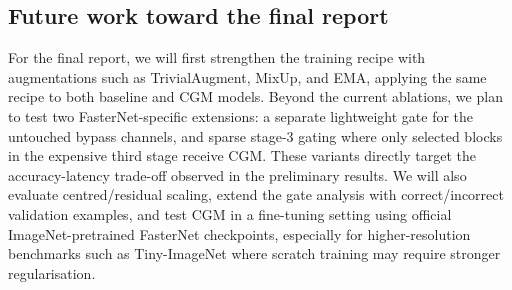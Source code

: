 \documentclass{article}
\begin{document}
\subsection{Future work toward the final report}\label{sec:future}

For the final report, we will first strengthen the training recipe with augmentations such as TrivialAugment, MixUp, and EMA, applying the same recipe to both baseline and CGM models. Beyond the current ablations, we plan to test two FasterNet-specific extensions: a separate lightweight gate for the untouched bypass channels, and sparse stage-3 gating where only selected blocks in the expensive third stage receive CGM. These variants directly target the accuracy-latency trade-off observed in the preliminary results. We will also evaluate centred/residual scaling, extend the gate analysis with correct/incorrect validation examples, and test CGM in a fine-tuning setting using official ImageNet-pretrained FasterNet checkpoints, especially for higher-resolution benchmarks such as Tiny-ImageNet where scratch training may require stronger regularisation.

{\small


}
\end{document}
